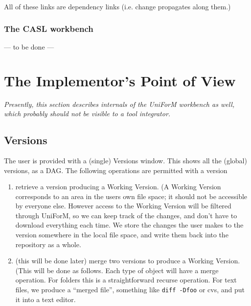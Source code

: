 \documentclass[a4paper]{article}
\begin{document}
All of these links are dependency links (i.e. change propagates along
them.)

\subsubsection{The CASL workbench}

--- to be done ---

\section{The Implementor's Point of View}

\emph{Presently, this section describes internals of the UniForM
  workbench as well, which probably should not be visible to a tool
  integrator.}

\subsection{Versions} 

The user is provided with a (single) Versions window.  This shows all the 
(global) versions, as a DAG.  The following operations are 
permitted with a version
\begin{enumerate}
\item  retrieve a version producing a Working Version.
    (A Working Version corresponds to an area in the users own file space;
    it should not be accessible by everyone else.  However access to the
    Working Version will be filtered through UniForM, so we can keep track
    of the changes, and don't have to download everything each time.
      We store the changes the user makes to the version somewhere in
      the local file space, and write them back into the repository as 
      a whole. 
  \item (this will be done later) merge two versions to produce a
    Working Version.  (This will be done as follows.  Each type of
    object will have a merge operation.  For folders this is a
    straightforward recurse operation.  For text files, we produce a
    ``merged file'', something like \texttt{diff -Dfoo} or cvs, and
    put it into a text editor.
\end{enumerate}

\end{document}
